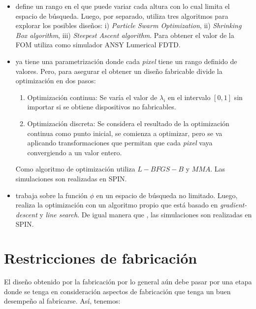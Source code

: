 \begin{itemize}

  \item \cite{Prosopio-Galarza2019} define un rango en el que puede variar cada altura con lo cual limita el espacio de búsqueda.
    Luego, por separado, utiliza tres algoritmos para explorar los posibles diseños: i) \emph{Particle Swarm Optimization}, ii) \emph{Shrinking Box algorithm}, iii) \emph{Steepest Ascent algorithm}. 
    Para obtener el valor de la FOM utiliza como simulador ANSY Lumerical FDTD.

  \item \cite{Su2020} ya tiene una parametrización donde cada \emph{pixel} tiene un rango definido de valores. 
  Pero, para asegurar el obtener un diseño fabricable divide la optimización en dos pasos:

  \begin{enumerate}
    \item Optimización continua: Se varía el valor de $\lambda_i$ en el intervalo $[0, 1]$ sin importar si se obtiene dispositivos no fabricables.

    \item Optimización discreta: Se considera el resultado de la optimización continua como punto inicial, se comienza a optimizar, pero se va aplicando transformaciones que permitan que cada \emph{pixel} vaya convergiendo a un valor entero.

  \end{enumerate}

  Como algoritmo de optimización utiliza $L-BFGS-B$ y $MMA$. Las simulaciones son realizadas en SPIN.

  \item \cite{Piggott2017} trabaja sobre la función $\phi$ en un espacio de búsqueda no limitado. 
    Luego, realiza la optimización con un algoritmo propio que está basado en \emph{gradient-descent} y \emph{line search}.
    De igual manera que \cite{Su2020}, las simulaciones son realizadas en SPIN.

\end{itemize}


\section{Restricciones de fabricación}

El diseño obtenido por la fabricación por lo general aún debe pasar por una etapa donde se tenga en consideración aspectos de fabricación que tenga un buen desempeño al fabricarse. Así, tenemos:

